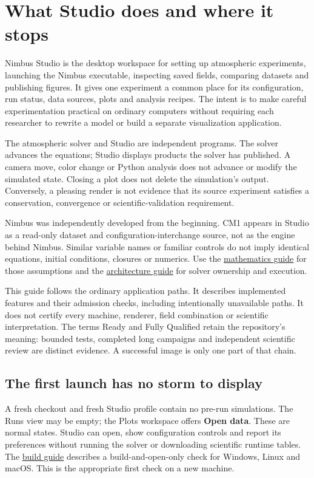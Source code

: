 \section{What Studio does and where it stops}
Nimbus Studio is the desktop workspace for setting up atmospheric experiments,
launching the Nimbus executable, inspecting saved fields, comparing datasets and
publishing figures. It gives one experiment a common place for its configuration,
run status, data sources, plots and analysis recipes. The intent is to make careful
experimentation practical on ordinary computers without requiring each researcher
to rewrite a model or build a separate visualization application.

The atmospheric solver and Studio are independent programs. The solver advances
the equations; Studio displays products the solver has published. A camera move,
color change or Python analysis does not advance or modify the simulated state.
Closing a plot does not delete the simulation's output. Conversely, a pleasing
render is not evidence that its source experiment satisfies a conservation,
convergence or scientific-validation requirement.

Nimbus was independently developed from the beginning. CM1 appears in Studio as a
read-only dataset and configuration-interchange source, not as the engine behind
Nimbus. Similar variable names or familiar controls do not imply identical
equations, initial conditions, closures or numerics. Use the
\href{MATHEMATICS.pdf}{mathematics guide} for those assumptions and the
\href{ARCHITECTURE.pdf}{architecture guide} for solver ownership and execution.

This guide follows the ordinary application paths. It describes implemented
features and their admission checks, including intentionally unavailable paths.
It does not certify every machine, renderer, field combination or scientific
interpretation. The terms Ready and Fully Qualified retain the repository's
meaning: bounded tests, completed long campaigns and independent scientific
review are distinct evidence. A successful image is only one part of that chain.



\subsection{The first launch has no storm to display}
A fresh checkout and fresh Studio profile contain no pre-run simulations. The
Runs view may be empty; the Plots workspace offers \textbf{Open data}. These are
normal states. Studio can open, show configuration controls and report its
preferences without running the solver or downloading scientific runtime tables.
The \href{BUILDING.md}{build guide} describes a build-and-open-only check for
Windows, Linux and macOS. This is the appropriate first check on a new machine.

